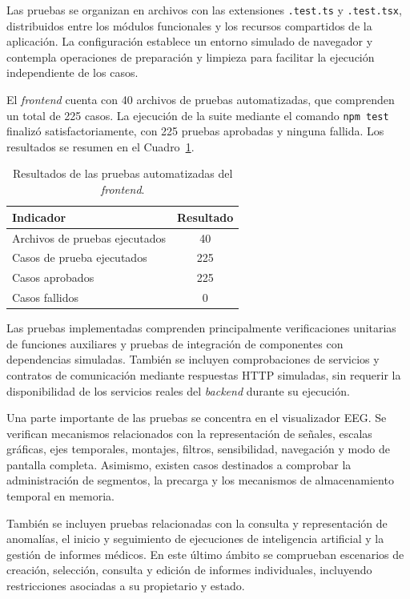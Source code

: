 Las pruebas se organizan en archivos
con las extensiones \texttt{.test.ts} y
\texttt{.test.tsx}, distribuidos entre
los módulos funcionales y los recursos
compartidos de la aplicación. La
configuración establece un entorno
simulado de navegador y contempla
operaciones de preparación y limpieza
para facilitar la ejecución independiente
de los casos.

El \textit{frontend} cuenta con 40 archivos de pruebas
automatizadas, que comprenden un total
de 225 casos. La ejecución de la suite
mediante el comando \texttt{npm test}
finalizó satisfactoriamente, con
225 pruebas aprobadas y ninguna fallida.
Los resultados se resumen en el
Cuadro~\ref{tab:pruebas-frontend}.

\begin{table}[htbp]
\centering
\caption{Resultados de las pruebas
automatizadas del \textit{frontend}.}
\label{tab:pruebas-frontend}
\begin{tabular}{|l|c|}
\hline
\textbf{Indicador} & \textbf{Resultado} \\
\hline
Archivos de pruebas ejecutados & 40 \\
\hline
Casos de prueba ejecutados & 225 \\
\hline
Casos aprobados & 225 \\
\hline
Casos fallidos & 0 \\
\hline
\end{tabular}
\end{table}

Las pruebas implementadas comprenden
principalmente verificaciones unitarias
de funciones auxiliares y pruebas de
integración de componentes con
dependencias simuladas. También se
incluyen comprobaciones de servicios
y contratos de comunicación mediante
respuestas HTTP simuladas, sin requerir
la disponibilidad de los servicios
reales del \textit{backend} durante su ejecución.

Una parte importante de las pruebas
se concentra en el visualizador EEG.
Se verifican mecanismos relacionados
con la representación de señales,
escalas gráficas, ejes temporales,
montajes, filtros, sensibilidad,
navegación y modo de pantalla completa.
Asimismo, existen casos destinados
a comprobar la administración de
segmentos, la precarga y los
mecanismos de almacenamiento
temporal en memoria.

También se incluyen pruebas
relacionadas con la consulta y
representación de anomalías,
el inicio y seguimiento de
ejecuciones de inteligencia
artificial y la gestión de
informes médicos. En este
último ámbito se comprueban
escenarios de creación,
selección, consulta y edición
de informes individuales,
incluyendo restricciones
asociadas a su propietario
y estado.

